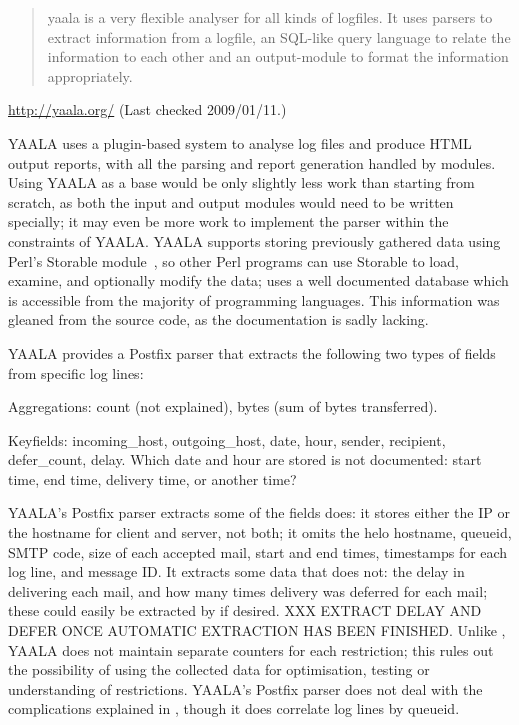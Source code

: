 \begin{quotation}

    yaala is a very flexible analyser for all kinds of logfiles. It uses
    parsers to extract information from a logfile, an SQL-like query
    language to relate the information to each other and an output-module
    to format the information appropriately.

\end{quotation}

\noindent{}\url{http://yaala.org/} \newline{}
(Last checked 2009/01/11.)

YAALA uses a plugin-based system to analyse log files and produce HTML
output reports, with all the parsing and report generation handled by
modules.  Using YAALA as a base would be only slightly less work than
starting from scratch, as both the input and output modules would need to
be written specially; it may even be more work to implement the parser
within the constraints of YAALA\@.  YAALA supports storing previously
gathered data using Perl's Storable module~\cite{perl-storable}, so other
Perl programs can use Storable to load, examine, and optionally modify the
data; \parsername{} uses a well documented database which is accessible
from the majority of programming languages.  This information was gleaned
from the source code, as the documentation is sadly lacking.

YAALA provides a Postfix parser that extracts the following two types of
fields from specific log lines:

\begin{eqlist}

    \item [Aggregations:] count (not explained), bytes (sum of bytes
        transferred).

    \item [Keyfields:] incoming\_host, outgoing\_host, date, hour, sender,
        recipient, defer\_count, delay.  Which date and hour are stored is
        not documented: start time, end time, delivery time, or another
        time?

\end{eqlist}

\noindent{}YAALA's Postfix parser extracts some of the fields \parsername{}
does: it stores either the \gls{IP} or the hostname for client and server,
not both; it omits the helo hostname, queueid, \gls{SMTP} code, size of
each accepted mail, start and end times, timestamps for each log line, and
message ID\@.  It extracts some data that \parsername{} does not: the delay
in delivering each mail, and how many times delivery was deferred for each
mail; these could easily be extracted by \parsername{} if desired.  XXX
EXTRACT DELAY AND DEFER ONCE AUTOMATIC EXTRACTION HAS BEEN FINISHED\@.
Unlike \parsername{}, YAALA does not maintain separate counters for each
restriction; this rules out the possibility of using the collected data for
optimisation, testing or understanding of restrictions.  YAALA's Postfix
parser does not deal with the complications explained in
, though it does correlate log lines by queueid.


